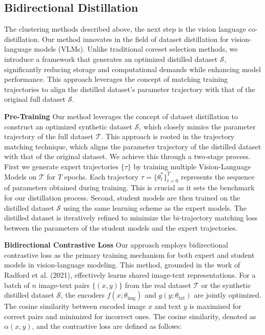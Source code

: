 \documentclass[sigconf, nonacm]{acmart}
\begin{document}
\subsection{Bidirectional Distillation}
The clustering methods described above, the next step is the vision language co-distillation. 
Our method innovates in the field of dataset distillation for vision-language models (VLMs). Unlike traditional coreset selection methods, we introduce a framework that generates an optimized distilled dataset ${\mathcal{S}}$, significantly reducing storage and computational demands while enhancing model performance. This approach \cite{cazenavette2022distillation} leverages the concept of matching training trajectories to align the distilled dataset's parameter trajectory with that of the original full dataset $\mathcal{S}$.
 

\textbf{Pre-Training} Our method leverages the concept of dataset distillation to construct an optimized synthetic dataset ${\mathcal{S}}$, which closely mimics the parameter trajectory of the full dataset $\mathcal{T}$. This approach is rooted in the trajectory matching technique, which aligns the parameter trajectory of the distilled dataset with that of the original dataset. We achieve this through a two-stage process. First we generate expert trajectories $\{\tau\}$ by training multiple Vision-Language Models on $\mathcal{T}$ for $T$ epochs. Each trajectory $\tau=\{\theta_t^*\}_{t=0}^T$ represents the sequence of parameters obtained during training. This is crucial as it sets the benchmark for our distillation process. Second, student models are then trained on the distilled dataset ${\mathcal{S}}$ using the same learning scheme as the expert models. The distilled dataset is iteratively refined to minimize the bi-trajectory matching loss between the parameters of the student models and the expert trajectories.

\textbf{Bidirectional Contrastive Loss} Our approach employs bidirectional contrastive loss as the primary training mechanism for both expert and student models in vision-language modeling. This method, grounded in the work of Radford et al. (2021), effectively learns shared image-text representations. For a batch of $n$ image-text pairs $\{(x, y)\}$ from the real dataset $\mathcal{T}$ or the synthetic distilled dataset ${\mathcal{S}}$, the encoders $f\left(x ; \theta_{\text{img}}\right)$ and $g\left(y ; \theta_{\text{txt}}\right)$ are jointly optimized. The cosine similarity between encoded image $x$ and text $y$ is maximized for correct pairs and minimized for incorrect ones. The cosine similarity, denoted as $\alpha(x, y)$, and the contrastive loss are defined as follows:
\end{document}
